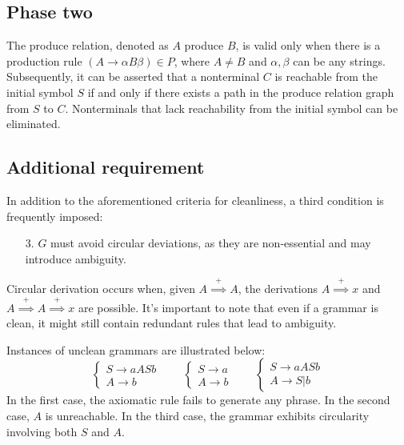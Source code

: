 \subsection{Phase two}
The produce relation, denoted as $A$ produce $B$, is valid only when there is a production rule $(A \rightarrow \alpha B \beta) \in P$, where $A \neq B$ and $\alpha,\beta$ can be any strings.
Subsequently, it can be asserted that a nonterminal $C$ is reachable from the initial symbol $S$ if and only if there exists a path in the produce relation graph from $S$ to $C$. 
Nonterminals that lack reachability from the initial symbol can be eliminated. 

\subsection{Additional requirement}
In addition to the aforementioned criteria for cleanliness, a third condition is frequently imposed:
\begin{enumerate}
    \item [3.] $G$ must avoid circular deviations, as they are non-essential and may introduce ambiguity.
\end{enumerate} 
Circular derivation occurs when, given $A \overset{+}{\implies} A$, the derivations $A \overset{+}{\implies} x$ and $A \overset{+}{\implies} A \overset{+}{\implies} x$ are possible.
It's important to note that even if a grammar is clean, it might still contain redundant rules that lead to ambiguity.
\begin{example}
    Instances of unclean grammars are illustrated below:
    \[\begin{cases}
        S \rightarrow aASb \\
        A \rightarrow b
    \end{cases} 
    \qquad
    \begin{cases}
        S \rightarrow a \\
        A \rightarrow b
    \end{cases} 
    \qquad
    \begin{cases}
        S \rightarrow aASb \\
        A \rightarrow S|b
    \end{cases} \]
    In the first case, the axiomatic rule fails to generate any phrase. 
    In the second case, $A$ is unreachable. 
    In the third case, the grammar exhibits circularity involving both $S$ and $A$.
\end{example}